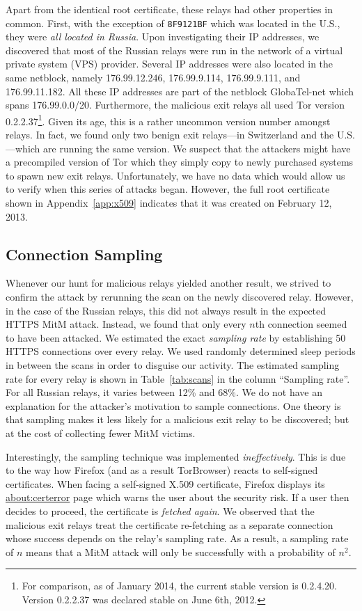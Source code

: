 \documentclass[letterpaper,twocolumn,10pt]{article}
\begin{document}
Apart from the identical root certificate, these relays had other properties in common.  First, with
the exception of \texttt{8F9121BF} which was located in the U.S., they were \emph{all located in
Russia}.  Upon investigating their IP addresses, we discovered that most of the Russian relays were
run in the network of a virtual private system (VPS) provider.  Several IP addresses were also
located in the same netblock, namely 176.99.12.246, 176.99.9.114, 176.99.9.111, and 176.99.11.182.
All these IP addresses are part of the netblock GlobaTel-net which spans 176.99.0.0/20.
Furthermore, the malicious exit relays all used Tor version 0.2.2.37\footnote{For comparison, as of
January 2014, the current stable version is 0.2.4.20.  Version 0.2.2.37 was declared stable on June
6th, 2012.}.  Given its age, this is a rather uncommon version number amongst relays.  In fact, we
found only two benign exit relays---in Switzerland and the U.S.---which are running the same
version.  We suspect that the attackers might have a precompiled version of Tor which they simply
copy to newly purchased systems to spawn new exit relays.  Unfortunately, we have no data which
would allow us to verify when this series of attacks began.  However, the full root certificate
shown in Appendix~\ref{app:x509} indicates that it was created on February 12, 2013.

\subsection{Connection Sampling}
\label{sec:sampling}
Whenever our hunt for malicious relays yielded another result, we strived to confirm the attack by
rerunning the scan on the newly discovered relay.  However, in the case of the Russian relays, this
did not always result in the expected HTTPS MitM attack.  Instead, we found that only every $n$th
connection seemed to have been attacked.  We estimated the exact \emph{sampling rate} by
establishing 50 HTTPS connections over every relay.  We used randomly determined sleep
periods in between the scans in order to disguise our activity.  The estimated sampling rate for
every relay is shown in Table~\ref{tab:scans} in the column ``Sampling rate''.  For all Russian
relays, it varies between 12\% and 68\%.  We do not have an explanation for the attacker's
motivation to sample connections.  One theory is that sampling makes it less likely for a malicious
exit relay to be discovered; but at the cost of collecting fewer MitM victims.

Interestingly, the sampling technique was implemented \emph{ineffectively}.  This is due to the way
how Firefox (and as a result TorBrowser) reacts to self-signed certificates.  When facing a
self-signed X.509 certificate, Firefox displays its \url{about:certerror} page which warns the user
about the security risk.  If a user then decides to proceed, the certificate is \emph{fetched
again}.  We observed that the malicious exit relays treat the certificate re-fetching as a separate
connection whose success depends on the relay's sampling rate.  As a result, a sampling rate of $n$
means that a MitM attack will only be successfully with a probability of $n^2$.
\end{document}
